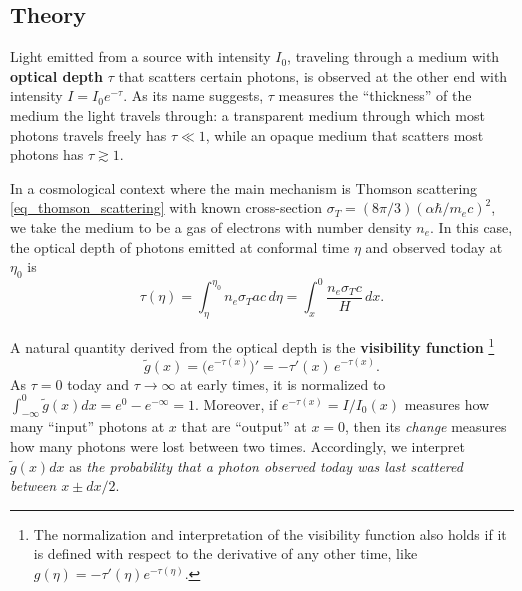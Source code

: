 \documentclass[10pt,a4paper]{article}
\begin{document}
\subsection{Theory}

Light emitted from a source with intensity $I_0$,
traveling through a medium with \textbf{optical depth} $\tau$ that scatters certain photons,
is observed at the other end with intensity $I = I_0 e^{-\tau}$.
As its name suggests, $\tau$ measures the ``thickness'' of the medium the light travels through:
a transparent medium through which most photons travels freely has $\tau \ll 1$,
while an opaque medium that scatters most photons has $\tau \gtrsim 1$.

In a cosmological context where the main mechanism is Thomson scattering \eqref{eq_thomson_scattering} with known cross-section $\sigma_T = (8\pi/3) (\alpha \hbar / m_e c)^2$,
we take the medium to be a gas of electrons with number density $n_e$.
In this case, the optical depth of photons emitted at conformal time $\eta$ and observed today at $\eta_0$ is
\begin{equation}
	\tau(\eta) = \int_\eta^{\eta_0} n_e \sigma_T a c \, d\eta = \int_x^0 \frac{n_e \sigma_T c}{H} \, dx.
\label{eq_optical_depth}
\end{equation}

A natural quantity derived from the optical depth is the \textbf{visibility function}%
\footnote{The normalization and interpretation of the visibility function also holds if it is defined with respect to the derivative of any other time, like $g(\eta) = -\tau'(\eta) e^{-\tau(\eta)}$.}
\begin{equation}
	\tilde{g}(x) = \Big( e^{-\tau(x)} \Big)' = -\tau'(x) \, e^{-\tau(x)}.
\label{eq_visibility_function}
\end{equation}
As $\tau=0$ today and $\tau \rightarrow \infty$ at early times,
it is normalized to $\int_{-\infty}^0 \tilde{g}(x) dx = e^0 - e^{-\infty}= 1$.
Moreover, if $e^{-\tau(x)} = I/I_0(x)$ measures how many ``input'' photons at $x$ that are ``output'' at $x=0$,
then its \emph{change} measures how many photons were lost between two times.
Accordingly, we interpret $\tilde{g}(x) dx$ as \emph{the probability that a photon observed today was last scattered between $x \pm dx/2$}.
\end{document}
